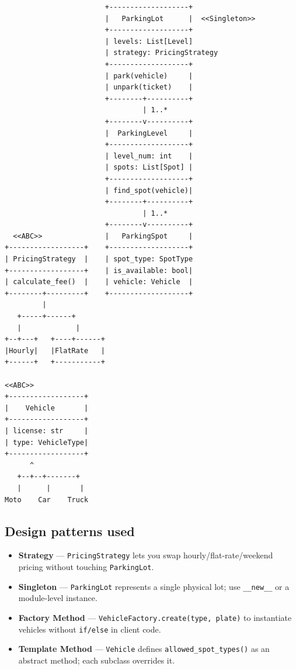 \documentclass[11pt]{article}
\providecommand{\tightlist}{\setlength{\itemsep}{1pt}\setlength{\parskip}{0pt}}
\begin{document}
\begin{verbatim}
                        +-------------------+
                        |   ParkingLot      |  <<Singleton>>
                        +-------------------+
                        | levels: List[Level]
                        | strategy: PricingStrategy
                        +-------------------+
                        | park(vehicle)     |
                        | unpark(ticket)    |
                        +--------+----------+
                                 | 1..*
                        +--------v----------+
                        |  ParkingLevel     |
                        +-------------------+
                        | level_num: int    |
                        | spots: List[Spot] |
                        +-------------------+
                        | find_spot(vehicle)|
                        +--------+----------+
                                 | 1..*
                        +--------v----------+
  <<ABC>>               |   ParkingSpot     |
+------------------+    +-------------------+
| PricingStrategy  |    | spot_type: SpotType
+------------------+    | is_available: bool|
| calculate_fee()  |    | vehicle: Vehicle  |
+--------+---------+    +-------------------+
         |
   +-----+------+
   |             |
+--+---+   +----+------+
|Hourly|   |FlatRate   |
+------+   +-----------+

<<ABC>>
+------------------+
|    Vehicle       |
+------------------+
| license: str     |
| type: VehicleType|
+------------------+
      ^
   +--+--+-------+
   |      |       |
Moto    Car    Truck
\end{verbatim}

\subsection{Design patterns used}\label{design-patterns-used-1}

\begin{itemize}
\tightlist
\item
  \textbf{Strategy} --- \texttt{PricingStrategy} lets you swap hourly/flat-rate/weekend pricing without touching \texttt{ParkingLot}.
\item
  \textbf{Singleton} --- \texttt{ParkingLot} represents a single physical lot; use \texttt{\_\_new\_\_} or a module-level instance.
\item
  \textbf{Factory Method} --- \texttt{VehicleFactory.create(type,\ plate)} to instantiate vehicles without \texttt{if/else} in client code.
\item
  \textbf{Template Method} --- \texttt{Vehicle} defines \texttt{allowed\_spot\_types()} as an abstract method; each subclass overrides it.
\end{itemize}
\end{document}
